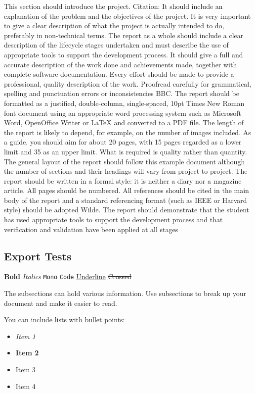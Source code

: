 \documentclass[twocolumn]{article}
\begin{document}
This section should introduce the project.
Citation: \autocite{wengGANWGAN2019}
It should include an explanation of the problem and the objectives of the project.
It is very important to give a clear description of what the project is actually intended to do, preferably in non-technical terms.
The report as a whole should include a clear description of the lifecycle stages undertaken and must describe the use of appropriate tools to support the development process.
It should give a full and accurate description of the work done and achievements made, together with complete software documentation.
Every effort should be made to provide a professional, quality description of the work.
Proofread carefully for grammatical, spelling and punctuation errors or inconsistencies BBC.
The report should be formatted as a justified, double-column, single-spaced, 10pt Times New Roman font document using an appropriate word processing system such as Microsoft Word, OpenOffice Writer or \LaTeX{} and converted to a PDF file.
The length of the report is likely to depend, for example, on the number of images included.
As a guide, you should aim for about 20 pages, with 15 pages regarded as a lower limit and 35 as an upper limit.
What is required is quality rather than quantity.
The general layout of the report should follow this example document although the number of sections and their headings will vary from project to project.
The report should be written in a formal style: it is neither a diary nor a magazine article.
All pages should be numbered.
All references should be cited in the main body of the report and a standard referencing format (such as IEEE or Harvard style) should be adopted Wilde.
The report should demonstrate that the student has used appropriate tools to support the development process and that verification and validation have been applied at all stages

\subsection{Export Tests}
\label{sec:org2eb698d}

\textbf{Bold}
\emph{Italics}
\texttt{Mono}
\texttt{Code}
\uline{Underline}
\sout{Crossed}

The subsections can hold various information.
Use subsections to break up your document and make it easier to read.

You can include lists with bullet points:
\begin{itemize}
\item \emph{Item 1}
\item \textbf{Item 2}
\item Item 3
\item Item 4
\end{itemize}

\printbibliography
\end{document}
